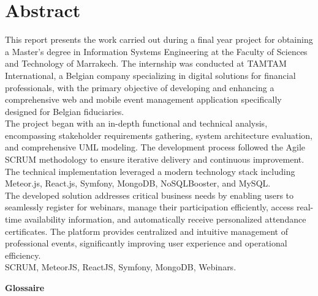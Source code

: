 \documentclass{rapportPFEHIND}
\begin{document}
\section*{Abstract}
This report presents the work carried out during a final year project for obtaining a Master's degree in Information Systems Engineering at the Faculty of Sciences and Technology of Marrakech. The internship was conducted at TAMTAM International, a Belgian company specializing in digital solutions for financial professionals, with the primary objective of developing and enhancing a comprehensive web and mobile event management application specifically designed for Belgian fiduciaries.\\[6pt]
The project began with an in-depth functional and technical analysis, encompassing stakeholder requirements gathering, system architecture evaluation, and comprehensive UML modeling. The development process followed the Agile SCRUM methodology to ensure iterative delivery and continuous improvement. The technical implementation leveraged a modern technology stack including Meteor.js, React.js, Symfony, MongoDB, NoSQLBooster, and MySQL.\\[6pt]
The developed solution addresses critical business needs by enabling users to seamlessly register for webinars, manage their participation efficiently, access real-time availability information, and automatically receive personalized attendance certificates. The platform provides centralized and intuitive management of professional events, significantly improving user experience and operational efficiency.\\[6pt]

 SCRUM, MeteorJS, ReactJS, Symfony, MongoDB, Webinars.
\clearpage

\clearpage
\thispagestyle{plain}
{}

\begin{center}
    {\fontsize{16}{19.2}\selectfont\bfseries\color{sectioncolor} Glossaire}
\end{center}

\vspace{0.8cm}
\end{document}
